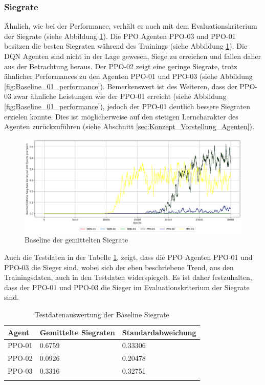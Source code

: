 \subsubsection{Siegrate} \label{sec:Evaluation_Siegrate}
Ähnlich, wie bei der Performance, verhält es auch mit dem Evaluationskriterium der Siegrate (siehe Abbildung \ref{fig:Baseline_winrate}).
Die PPO Agenten PPO-03 und PPO-01 besitzen die besten Siegraten während des Trainings (siehe Abbildung \ref{fig:Baseline_winrate}). 
Die DQN Agenten sind nicht in der Lage gewesen, Siege zu erreichen und fallen daher aus der Betrachtung heraus.
Der PPO-02 zeigt eine geringe Siegrate, trotz ähnlicher Performances zu den Agenten PPO-01 und PPO-03 (siehe Abbildung \ref{fig:Baseline_01_performance}).
Bemerkenswert ist des Weiteren, dass der PPO-03 zwar ähnliche Leistungen wie der PPO-01 erreicht (siehe Abbildung \ref{fig:Baseline_01_performance}), jedoch der PPO-01 deutlich bessere Siegraten erzielen konnte. Dies ist möglicherweise auf den stetigen Lerncharakter des Agenten zurückzuführen (siehe Abschnitt \ref{sec:Konzept_Vorstellung_Agenten}).
\begin{figure}[H]
	\centering
	\includegraphics[scale=0.4517]{Abbildungen/Evaluation/baseline-winrate.png}
	\caption[Baseline Vergleich Siegrate]{Baseline der gemittelten Siegrate}
	\label{fig:Baseline_winrate}
\end{figure}
Auch die Testdaten in der Tabelle \ref{tab:Evaluation_Testdaten_Winrate}, zeigt, dass die PPO Agenten PPO-01 und PPO-03 die Sieger sind, wobei sich der eben beschriebene Trend, aus den Trainingsdaten, auch in den Testdaten widerspiegelt. Es ist daher festzuhalten, dass der PPO-01 und PPO-03 die Sieger im Evaluationskriterium der Siegrate sind.

\begin{longtable}[h]{|p{3.7cm}|p{4.5cm}|p{4.5cm}|}
	\hline
	Agent & Gemittelte Siegraten & Standardabweichung \\
	\hline
	PPO-01 & 0.6759 & 0.33306 \\
	\hline
	PPO-02 & 0.0926 & 0.20478 \\
	\hline
	PPO-03 & 0.3316 & 0.32751 \\
	\hline
	\caption{Testdatenauswertung der Baseline Siegrate}
	\label{tab:Evaluation_Testdaten_Winrate} 
\end{longtable}

